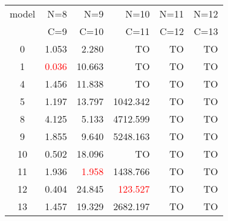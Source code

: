  \begin{tabular}[c] {|c||r|r|r|r|r|}\hline
  model &   N=8     & N=9      & N=10      & N=11      & N=12 \\
        &         C=9     & C=10     & C=11      & C=12      & C=13 \\\hline
  0     &         1.053   & 2.280    & TO        & TO        & TO \\
  1     &         \textcolor{red}{0.036}   & 10.663   & TO        & TO        & TO \\
  4     &         1.456   & 11.838   & TO        & TO        & TO \\
  5     & 1.197   & 13.797   & 1042.342  & TO        & TO \\
  8     &         4.125   & 5.133    & 4712.599  & TO        & TO \\
  9     & 1.855   & 9.640    & 5248.163  & TO        & TO \\
  10    &         0.502   & 18.096   & TO        & TO        & TO \\
  11    & 1.936   & \textcolor{red}{1.958}    & 1438.766  & TO        & TO \\
  12    &         0.404   & 24.845   & \textcolor{red}{123.527}   & TO        & TO \\
  13    & 1.457   & 19.329   & 2682.197  & TO        & TO \\\hline
  \end{tabular}
